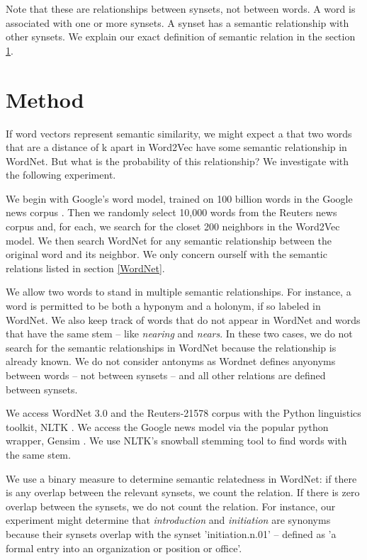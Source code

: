 \documentclass{article}
\begin{document}
Note that these are relationships between synsets, not between words. A word is associated with one or more synsets. A synset has a semantic relationship with other synsets. We explain our exact definition of semantic relation in the section \ref{method}.

\section{Method} \label{method}
If word vectors represent semantic similarity, we might expect a that two words that are a distance of k apart in Word2Vec have some semantic relationship in WordNet. But what is the probability of this relationship? We investigate with the following experiment. 

We begin with Google's word model, trained on 100 billion words in the Google news corpus \cite{Word2VecWebsite}. Then we randomly select 10,000 words from the Reuters news corpus and, for each, we search for the closet 200 neighbors in the Word2Vec model. We then search WordNet for any semantic relationship between the original word and its neighbor. We only concern ourself with the semantic relations listed in section \ref{WordNet}. 

We allow two words to stand in multiple semantic relationships. For instance, a word is permitted to be both a hyponym and a holonym, if so labeled in WordNet. We also keep track of words that do not appear in WordNet and words that have the same stem -- like \textit{nearing} and \textit{nears}. In these two cases, we do not search for the semantic relationships in WordNet because the relationship is already known. We do not consider antonyms as Wordnet defines anyonyms between words -- not between synsets -- and all other relations are defined between synsets. 

We access WordNet 3.0 and the Reuters-21578 \cite{rose2002reuters} corpus with the Python linguistics toolkit, NLTK \cite{BirdKleinLoper09}. We access the Google news model via the popular python wrapper, Gensim \cite{gensim}. We use NLTK's snowball stemming tool to find words with the same stem. 

We use a binary measure to determine semantic relatedness in WordNet: if there is any overlap between the relevant synsets, we count the relation. If there is zero overlap between the synsets, we do not count the relation. For instance, our experiment might determine that \textit{introduction} and \textit{initiation} are synonyms because their synsets overlap with the synset 'initiation.n.01' -- defined as 'a formal entry into an organization or position or office'. 
\end{document}
